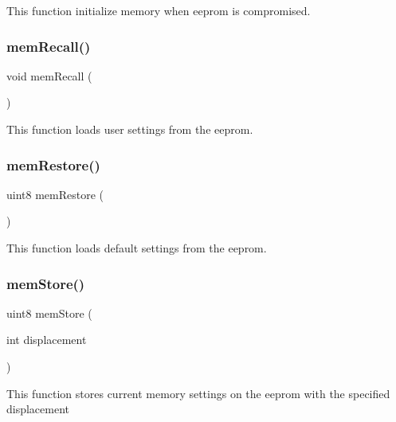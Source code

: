 This function initialize memory when eeprom is compromised. \mbox{\label{command__processing_8h_a3d3b232874d20b4317e9a79cc3c328d9}} 
\subsubsection{mem\+Recall()}
{\footnotesize\ttfamily void mem\+Recall (\begin{DoxyParamCaption}{ }\end{DoxyParamCaption})}

This function loads user settings from the eeprom. \mbox{\label{command__processing_8h_abdb69a74e3147f28d6cbd2b1d406c8a9}} 
\subsubsection{mem\+Restore()}
{\footnotesize\ttfamily uint8 mem\+Restore (\begin{DoxyParamCaption}{ }\end{DoxyParamCaption})}

This function loads default settings from the eeprom. \mbox{\label{command__processing_8h_ad37da1fb5c1ccf35a9a53595b8bab54c}} 
\subsubsection{mem\+Store()}
{\footnotesize\ttfamily uint8 mem\+Store (\begin{DoxyParamCaption}\item[{int}]{displacement }\end{DoxyParamCaption})}

This function stores current memory settings on the eeprom with the specified displacement 